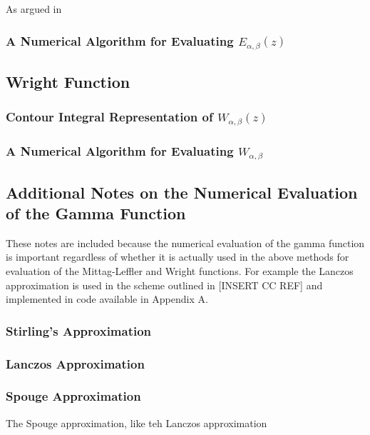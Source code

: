 As argued in 

\subsubsection{A Numerical Algorithm for Evaluating $ E_{\alpha, \beta}(z) $}

\subsection{Wright Function}
\subsubsection{Contour Integral Representation of $ W_{\alpha, \beta}(z) $}
\subsubsection{A Numerical Algorithm for Evaluating $ W_{\alpha, \beta} $}

\subsection{Additional Notes on the Numerical Evaluation of the Gamma Function}
\label{sec:num-gamma}
These notes are included because the numerical evaluation of the gamma function is important regardless of
whether it is actually used in the above methods for evaluation of the Mittag-Leffler and Wright functions.
For example the Lanczos approximation is used in the scheme outlined in [INSERT CC REF] and implemented 
in code available in Appendix A.

\subsubsection{Stirling's Approximation}

\subsubsection{Lanczos Approximation}

\subsubsection{Spouge Approximation}
The Spouge approximation, like teh Lanczos approximation 

\clearpage
